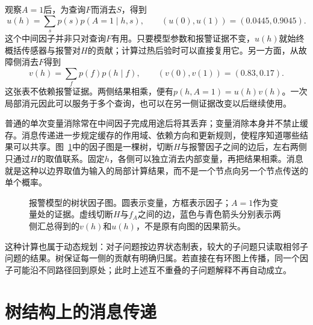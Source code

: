 观察$A=1$后，为查询$F$而消去$S$，得到
\begin{equation}
  u(h)=\sum_s p(s)p(A=1\mid h,s),
  \qquad (u(0),u(1))=(0.0445,0.9045).
  \label{eq:pgm-junction-tree-boundary-likelihood}
\end{equation}
这个中间因子并非只对查询$F$有用。只要模型参数和报警证据不变，$u(h)$就始终概括传感器与报警对$H$的贡献；计算过热后验时可以直接复用它。另一方面，从故障侧消去$F$得到
\begin{equation}
  v(h)=\sum_f p(f)p(h\mid f),
  \qquad (v(0),v(1))=(0.83,0.17).
  \label{eq:pgm-junction-tree-boundary-prior}
\end{equation}
这张表不依赖报警证据。两侧结果相乘，便有$p(h,A=1)=u(h)v(h)$。一次局部消元因此可以服务于多个查询，也可以在另一侧证据改变以后继续使用。

普通的单次变量消除常在中间因子完成用途后将其丢弃；变量消除本身并不禁止缓存。消息传递进一步规定缓存的作用域、依赖方向和更新规则，使程序知道哪些结果可以共享。图~\ref{fig:pgm-junction-tree-factor-cut}中的因子图是一棵树，切断$H$与报警因子之间的边后，左右两侧只通过$H$的取值联系。固定$h$，各侧可以独立消去内部变量，再把结果相乘。消息就是这种以边界取值为输入的局部计算结果，而不是一个节点向另一个节点传送的单个概率。

\begin{figure}[htbp]
  \centering
  
  \caption{报警模型的树状因子图。圆表示变量，方框表示因子；$A=1$作为变量处的证据。虚线切断$H$与$f_A$之间的边，蓝色与青色箭头分别表示两侧汇总得到的$v(h)$和$u(h)$，不是原有向图的因果箭头。}
  \label{fig:pgm-junction-tree-factor-cut}
\end{figure}

这种计算也属于动态规划：对子问题按边界状态制表，较大的子问题只读取相邻子问题的结果。树保证每一侧的贡献有明确归属。若直接在有环图上传播，同一个因子可能沿不同路径回到原处；此时上述互不重叠的子问题解释不再自动成立。

\section{树结构上的消息传递}
\label{sec:pgm-junction-tree-tree-messages}

